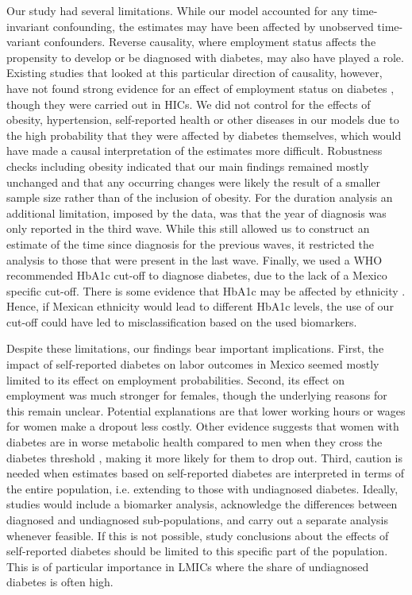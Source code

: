 \documentclass[12pt,english]{article}
\begin{document}
Our study had several limitations. While our model accounted for any time-invariant confounding, the estimates may have been affected by unobserved time-variant confounders. Reverse causality, where employment status affects the propensity to develop or be diagnosed with diabetes, may also have played a role. Existing studies that looked at this particular direction of causality, however, have not found strong evidence for an effect of employment status on diabetes \parencite{Bergemann2011,Schaller2015}, though they were carried out in \acp{HIC}. We did not control for the effects of obesity, hypertension, self-reported health or other diseases in our models due to the high probability that they were affected by diabetes themselves, which would have made a causal interpretation of the estimates more difficult. Robustness checks including obesity indicated that our main findings remained mostly unchanged and that any occurring changes were likely the result of a smaller sample size rather than of the inclusion of obesity.  For the duration analysis an additional limitation, imposed by the data, was that the year of diagnosis was only reported in the third wave. While this still allowed us to construct an estimate of the time since diagnosis for the previous waves, it restricted the analysis to those that were present in the last wave. Finally, we used a WHO recommended \ac{HbA1c} cut-off to diagnose diabetes, due to the lack of a Mexico specific cut-off. There is some evidence that \ac{HbA1c} may be affected by ethnicity \parencite{Sacks2011}. Hence, if Mexican ethnicity would lead to different \ac{HbA1c} levels, the use of our cut-off could have led to misclassification based on the used biomarkers.  

Despite these limitations, our findings bear important implications. First, the impact of self-reported diabetes on labor outcomes in Mexico seemed mostly limited to its effect on employment probabilities.  Second, its effect on employment was much stronger for females, though the underlying reasons for this remain unclear. Potential explanations are that lower working hours or wages for women make a dropout less costly. Other evidence suggests that women with diabetes are in worse metabolic health compared to men when they cross the diabetes threshold \parencite{Peters2015}, making it more likely for them to drop out. Third, caution is needed when estimates based on self-reported diabetes are interpreted in terms of the entire population, i.e. extending to those with undiagnosed diabetes. Ideally, studies would  include a biomarker analysis, acknowledge the differences between diagnosed and undiagnosed sub-populations, and carry out a separate analysis whenever feasible. If this is not possible, study conclusions about the effects of self-reported diabetes should be limited to this specific part of the population. This is of particular importance in \acp{LMIC} where the share of undiagnosed diabetes is often high.  
\end{document}

